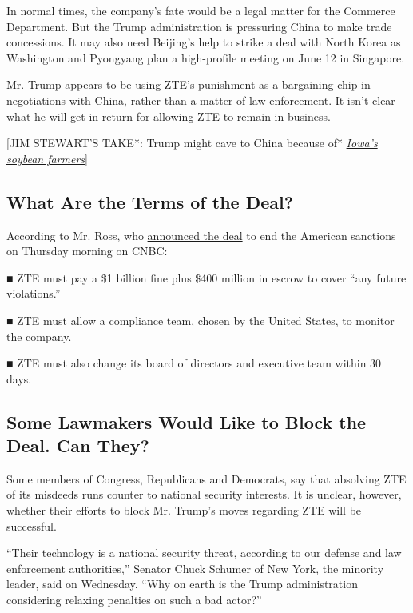 In normal times, the company's fate would be a legal matter for the
Commerce Department. But the Trump administration is pressuring China to
make trade concessions. It may also need Beijing's help to strike a deal
with North Korea as Washington and Pyongyang plan a high-profile meeting
on June 12 in Singapore.

Mr. Trump appears to be using ZTE's punishment as a bargaining chip in
negotiations with China, rather than a matter of law enforcement. It
isn't clear what he will get in return for allowing ZTE to remain in
business.

{[}JIM STEWART'S TAKE*: Trump might cave to China because of*
\href{https://www.nytimes.com/2018/06/07/business/trump-trade-china-iowa-soybeans.html?action=click\&module=Top\%20Stories\&pgtype=Homepage}{\emph{Iowa's
soybean farmers}}{]}

\hypertarget{what-are-the-terms-of-the-deal}{%
\subsection{What Are the Terms of the
Deal?}\label{what-are-the-terms-of-the-deal}}

According to Mr. Ross, who
\href{https://www.commerce.gov/news/press-releases/2018/06/secretary-ross-announces-14-billion-zte-settlement-zte-board-management}{announced
the deal} to end the American sanctions on Thursday morning on CNBC:

■ ZTE must pay a \$1 billion fine plus \$400 million in escrow to cover
``any future violations.''

■ ZTE must allow a compliance team, chosen by the United States, to
monitor the company.

■ ZTE must also change its board of directors and executive team within
30 days.

\hypertarget{some-lawmakers-would-like-to-block-the-deal-can-they}{%
\subsection{Some Lawmakers Would Like to Block the Deal. Can
They?}\label{some-lawmakers-would-like-to-block-the-deal-can-they}}

Some members of Congress, Republicans and Democrats, say that absolving
ZTE of its misdeeds runs counter to national security interests. It is
unclear, however, whether their efforts to block Mr. Trump's moves
regarding ZTE will be successful.

``Their technology is a national security threat, according to our
defense and law enforcement authorities,'' Senator Chuck Schumer of New
York, the minority leader, said on Wednesday. ``Why on earth is the
Trump administration considering relaxing penalties on such a bad
actor?''

